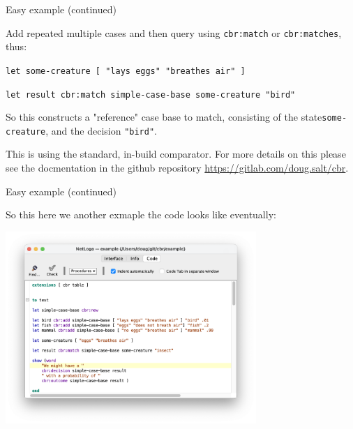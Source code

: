 \documentclass[usenames,dvipsnames,10pt]{beamer} %
\begin{document}
\begin{frame}{Easy example (continued) }

    Add repeated multiple cases and then query using \texttt{{\color{blue}cbr:match}} or  \texttt{{\color{blue}cbr:matches}}, thus:

    \vspace{0.5cm}
    \small

    \texttt{let some-creature [ {\color{red}"lays eggs" "breathes air"} ]}

    \texttt{let result {\color{blue}cbr:match} simple-case-base some-creature {\color{red}"bird"}}

    \vspace{0.5cm}

    \normalsize
    So this constructs a "reference" case base to match, consisting of the state\texttt{some-creature}, and the decision \texttt{\color{red}"bird"}.

    \vspace{0.25cm}
    This is using the standard, in-build comparator. For more details on this please see the docmentation in the github repository \url{https://gitlab.com/doug.salt/cbr}.

\end{frame}
\begin{frame}{Easy example (continued) }

    So this here we another exmaple the code looks like eventually:

    \includegraphics[width=9.5cm]{"simple-example-code.png"}

\end{frame}
\end{document}
